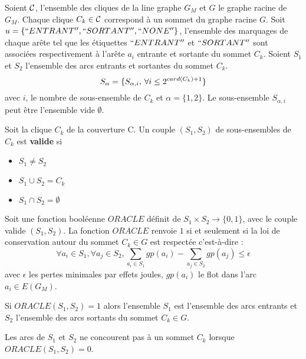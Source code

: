 Soient $\cal C$, l'ensemble des cliques de la line graphe $G_M$ et $G$ le graphe racine de $G_M$. \newline
Chaque clique $C_k \in {\cal C}$ correspond \`a un sommet du graphe racine $G$. \newline 
Soit $u = \{``ENTRANT'', ``SORTANT'', ``NONE''\}$, l'ensemble des marquages de chaque ar\^ete tel que les \'etiquettes $``ENTRANT''$ et $``SORTANT''$ sont associ\'ees respectivement \`a l'ar\^ete $a_i$ entrante et sortante du sommet $C_k$.
\newline
Soient $S_1$ et $S_2$ l'ensemble des arcs entrants et sortantes du sommet $C_k$.
\begin{equation}
S_\alpha = \{ S_{\alpha,i}, \hspace{0.2 em} \forall i \le 2^{card(C_k)+1}  \}
\end{equation}
avec $i$, le nombre de sous-ensemble de $C_k$ et $\alpha = \{1,2\}$. Le sous-ensemble $S_{\alpha,i}$ peut \^etre  l'ensemble vide $\emptyset$.
 
 \begin{definition}
 Soit la clique $C_k$ de la couverture {\cal C}.
 Un couple $(S_1,S_2)$ de sous-ensembles de $C_k$ est {\bf valide} si 
 \begin{itemize}
 \item $S_1 \ne S_2$
 \item $S_1 \cup S_2 = C_k$
 \item $S_1 \cap S_2 = \emptyset$
 \end{itemize}
 \end{definition}
 
 \begin{definition}
 Soit une fonction bool\'eenne $ORACLE$ d\'efinit de $S_1 \times S_2 \rightarrow \{0,1\}$, avec le couple valide $(S_1,S_2)$.
 La fonction $ORACLE$ renvoie $1$ si et seulement si la loi de conservation autour du sommet $C_k \in G$ est respect\'ee c'est-\`a-dire : 
 \begin{equation}
 \forall a_i \in S_1, \forall a_j \in S_2, \sum_{a_i \in S_1} gp(a_i) - \sum_{a_j \in S_2} gp(a_j) \le \epsilon
 \end{equation}
 avec $\epsilon$ les pertes minimales par effets joules, $gp(a_i)$ le flot dans l'arc $a_i \in E(G_M)$.
 \end{definition}
 
 \begin{property}
 Si $ORACLE(S_1, S_2) = 1$ alors l'ensemble  $S_1$ est l'ensemble des arcs entrants et  $S_2$ l'ensemble des arcs sortants du sommet $C_k \in G$.
 \end{property} 
Les arcs de $S_1$ et $S_2$ ne concourent pas \`a un sommet $C_k$ lorsque  $ORACLE(S_1, S_2) = 0$.

